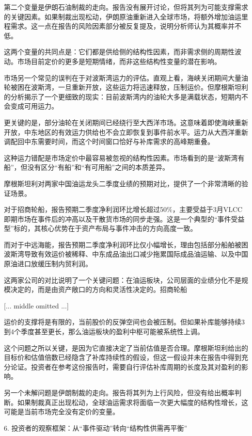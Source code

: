 \documentclass[11pt]{ctexart}
\begin{document}
第二个变量是伊朗石油制裁的走向。报告没有展开讨论，但将其列为可能支撑需求的关键因素。如果制裁出现松动，伊朗原油重新进入全球市场，将额外增加油运里程需求。这一点在报告的风险因素部分被反复提及，说明分析师认为其概率并不低。

这两个变量的共同点是：它们都是供给侧的结构性因素，而非需求侧的周期性波动。市场目前定价的更多是短期情绪，而非这些结构性变量的潜在影响。

市场另一个常见的误判在于对波斯湾运力的评估。直观上看，海峡关闭期间大量油轮被困在波斯湾，一旦重新开放，这些运力将迅速释放，压制运价。但摩根斯坦利的分析揭示了一个更细致的现实：目前波斯湾内的油轮大多是满载状态，短期内不会变成可用运力。

更关键的是，部分油轮在关闭期间已经绕行至大西洋市场。这意味着即使海峡重新开放，中东地区的有效运力供给也不会立即恢复到事件前水平。运力从大西洋重新调配回中东需要时间，而这个时间窗口恰好与补库需求的高峰期重叠。

这种运力错配是市场定价中最容易被忽视的结构性因素。市场看到的是“波斯湾有船”，但没有区分“有船”和“有可用船”之间的本质差异。

摩根斯坦利对两家中国油运龙头二季度业绩的预期对比，提供了一个非常清晰的验证场景。

对于招商轮船，报告预期二季度净利润环比增长超过50\%，主要受益于3月VLCC即期市场在事件后的冲高以及干散货市场的同步走强。这是一个典型的“事件受益型”标的，其核心优势在于资产布局与事件冲击的方向高度一致。

而对于中远海能，报告预期二季度净利润环比仅小幅增长，理由包括部分船舶被困波斯湾导致有效运价被稀释、中东成品油出口减少拖累国际成品油运输、以及中国原油进口放缓压制内贸利润。

这两家公司的对比说明了一个关键问题：在油运板块，公司层面的业绩分化不是规模决定的，而是由资产敞口的方向和灵活性决定的。招商轮船

[... middle omitted ...]

运价的支撑将是有限的，当前股价的反弹空间也会被压制。但如果补库能够持续3到4个季度甚至更长，那么油运板块的盈利中枢可能被系统性上调。

这个问题之所以关键，是因为它直接决定了当前估值是否合理。摩根斯坦利给出的目标价和估值倍数已经隐含了补库持续性的假设，但这一假设并未在报告中得到充分论证。投资者在参考这份报告时，需要自行评估补库周期的长度及其对盈利的影响。

另一个未解问题是伊朗制裁的走向。报告将其列为上行风险，但没有给出概率判断。如果制裁真正出现松动，全球油运需求将面临一次更大幅度的结构性增长，这可能是当前市场完全没有定价的变量。

6. 投资者的观察框架：从“事件驱动”转向“结构性供需再平衡”
\end{document}
